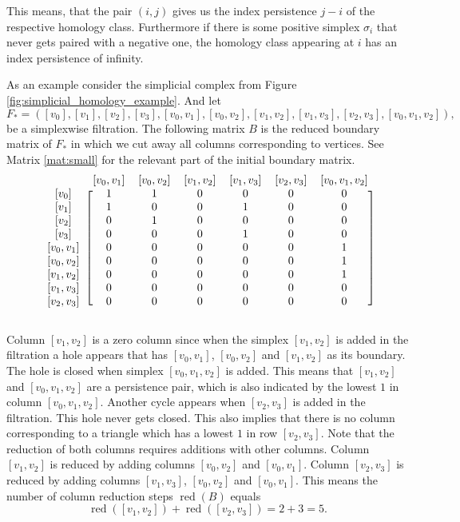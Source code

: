This means, that the pair $(i,j)$ gives us the index persistence $j-i$ of the respective homology class. Furthermore if there is some positive simplex $\sigma_i$ that never gets paired with a negative one, the homology class appearing at $i$ has an index persistence of infinity.

As an example consider the simplicial complex from Figure \ref{fig:simplicial_homology_example}. And let \[
F_* = ([v_0],[v_1],[v_2],[v_3],[v_0,v_1],[v_0,v_2],[v_1,v_2],[v_1,v_3],[v_2,v_3],[v_0,v_1,v_2]),
\]
be a simplexwise filtration. The following matrix $B$ is the reduced boundary matrix of $F_*$ in which we cut away all columns corresponding to vertices. See Matrix \ref{mat:small} for the relevant part of the initial boundary matrix.
\[
\begin{blockarray}{ccccccc}
\label{tab:reduction}
& [v_0,v_1] & [v_0,v_2] & [v_1,v_2] & [v_1,v_3] & [v_2,v_3] & [v_0,v_1,v_2] \\
\begin{block}{c[cccccc]}
  \left[v_0\right]  & 1 & 1 & 0 & 0 & 0 & 0\\*
  \left[v_1\right]  & 1 & 0 & 0 & 1 & 0 & 0\\*
  \left[v_2\right]  & 0 & 1 & 0 & 0 & 0 & 0\\*
  \left[v_3\right]  & 0 & 0 & 0 & 1 & 0 & 0\\*
  \left[v_0,v_1\right]  & 0 & 0 & 0 & 0 & 0 & 1\\*
  \left[v_0,v_2\right]  & 0 & 0 & 0 & 0 & 0 & 1\\*
  \left[v_1,v_2\right]  & 0 & 0 & 0 & 0 & 0 & 1\\*
  \left[v_1,v_3\right]  & 0 & 0 & 0 & 0 & 0 & 0\\*
  \left[v_2,v_3\right]  & 0 & 0 & 0 & 0 & 0 & 0\\*
\end{block}
\end{blockarray}
\]

Column $[v_1,v_2]$ is a zero column since when the simplex $[v_1,v_2]$ is added in the filtration a hole appears that has $[v_0,v_1]$, $[v_0,v_2]$ and $[v_1,v_2]$ as its boundary. The hole is closed when simplex $[v_0,v_1,v_2]$ is added. This means that $[v_1,v_2]$ and $[v_0,v_1,v_2]$ are a persistence pair, which is also indicated by the lowest $1$ in column $[v_0,v_1,v_2]$. Another cycle appears when $[v_2,v_3]$ is added in the filtration. This hole never gets closed. This also implies that there is no column corresponding to a triangle which has a lowest $1$ in row $[v_2,v_3]$. Note that the reduction of both columns requires additions with other columns. Column $[v_1,v_2]$ is reduced by adding columns $[v_0,v_2]$ and $[v_0,v_1]$. Column $[v_2,v_3]$ is reduced by adding columns $[v_1,v_3]$, $[v_0,v_2]$ and $[v_0,v_1]$. This means the number of column reduction steps $\operatorname{red}(B)$ equals \[\operatorname{red}([v_1,v_2]) + \operatorname{red}([v_2,v_3]) = 2 + 3 = 5.\] 

